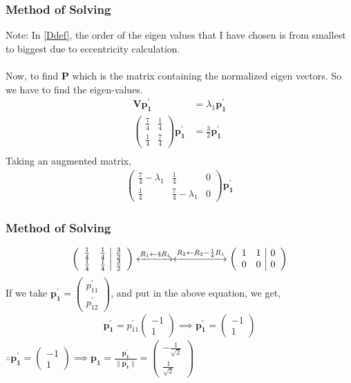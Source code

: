 \documentclass{beamer}
\providecommand{\brak}[1]{\ensuremath{\left(#1\right)}}
\theoremstyle{remark}
\providecommand{\norm}[1]{\lVert#1\rVert}
\newcommand{\myvec}[1]{\ensuremath{\begin{pmatrix}#1\end{pmatrix}}}
\let\vec\mathbf
\numberwithin{equation}{section}
\begin{document}
\begin{frame}
	\frametitle{Method of Solving}
	Note: In \eqref{Ddef}, the order of the eigen values that I have chosen is from smallest to biggest due to eccentricity calculation.\\
	\\
	Now, to find $\vec{P}$ which is the matrix containing the normalized eigen vectors. So we have to find the eigen-values.
	\begin{align}
		\vec{V}\vec{p_1^\prime} &= \lambda_1 \vec{p_1^\prime} \\
		\myvec{\frac{7}{4} & \frac{1}{4} \\ \frac{1}{4} & \frac{7}{4}} \vec{p_1^\prime}  &= \frac{3}{2}\vec{p_1^\prime} \\
	\end{align}
	Taking an augmented matrix,
	\begin{align}
		\brak{
			\begin{array}{cc|c}
				\frac{7}{4} - \lambda_1 & \frac{1}{4} & 0\\ 
				\frac{1}{4} & \frac{7}{4} - \lambda_1& 0
		\end{array}}\vec{p_1^\prime} 
	\end{align}
\end{frame}
\begin{frame}
	\frametitle{Method of Solving}
	\begin{align}
		\brak{
			\begin{array}{cc|c}
				\frac{1}{4} & \frac{1}{4} & \frac{3}{2}\\ 
				\frac{1}{4} & \frac{1}{4} & \frac{3}{2}
		\end{array}}
		\xleftrightarrow[]{R_1 \leftarrow {4 R_1}}
		\xleftrightarrow[]{R_2 \leftarrow {R_2-\frac{1}{4}R_1}}
		\brak{
			\begin{array}{cc|c}
				1 & 1 & 0\\ 
				0 & 0 & 0
		\end{array}}
	\end{align}
	If we take $\vec{p_1^\prime}  = \myvec{p_{11}^\prime \\ p_{12}^\prime}$, and put in the above equation, we get,
	\begin{align}
		\vec{p_1^\prime} = p_{11}^\prime \myvec{-1 \\ 1} \implies \vec{p_1^\prime} =  \myvec{-1 \\ 1}
	\end{align}
	$\therefore \vec{p_1^\prime}  = \myvec{-1 \\ 1} \implies \vec{p_1} = \frac{\vec{p_1^\prime} }{\norm{\vec{p_1^\prime}}}  = \myvec{ -\frac{1}{\sqrt{2}} \\ \frac{1}{\sqrt{2}}}$ \\
\end{frame}
\end{document}
